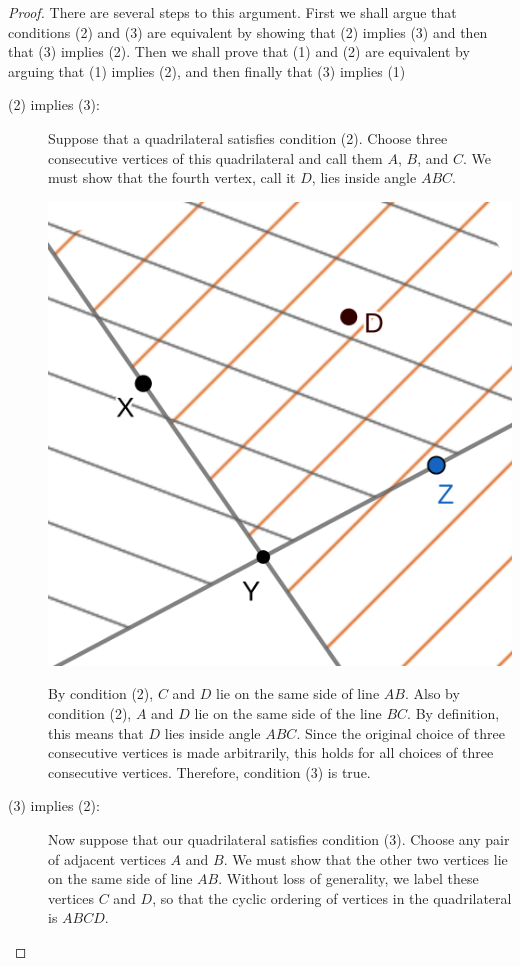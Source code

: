 \documentclass{tufte-handout}
\theoremstyle{definition}
\begin{document}
\begin{proof}
There are several steps to this argument. First we shall argue that conditions (2) and (3) are equivalent by showing that (2) implies (3) and then that (3) implies (2). Then we shall prove that (1) and (2) are equivalent by arguing that (1) implies (2), and then finally that (3) implies (1)

\begin{description}
\item[(2) implies (3):] Suppose that a quadrilateral satisfies condition (2). Choose three consecutive vertices of this quadrilateral and call them $A$, $B$, and $C$. We must show that the fourth vertex, call it $D$, lies inside angle $ABC$.

\begin{marginfigure}
  \includegraphics{images/convex_1.png}
\end{marginfigure}


By condition (2), $C$ and $D$ lie on the same side of line $AB$. Also by condition (2), $A$ and $D$ lie on the same side of the line $BC$. By definition, this means that $D$ lies inside angle $ABC$. Since the original choice of three consecutive vertices is made arbitrarily, this holds for all choices of three consecutive vertices. Therefore, condition (3) is true.


\item[(3) implies (2):] Now suppose that our quadrilateral satisfies condition (3). Choose any pair of adjacent vertices $A$ and $B$. We must show that the other two vertices lie on the same side of line $AB$. Without loss of generality, we label these vertices $C$ and $D$, so that the cyclic ordering of vertices in the quadrilateral is $ABCD$.


\end{description}
\end{proof}
\end{document}
